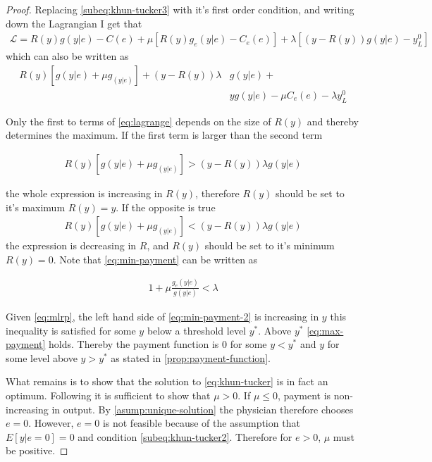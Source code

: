 \begin{proof}
Replacing \cref{subeq:khun-tucker3} with it's  first order condition, and writing down the Lagrangian I get that 
\begin{align}
    \mathcal{L}=R(y)g(y|e)-C(e)+\mu [R(y)g_e(y|e)-C_e(e)]+\lambda [(y-R(y))g(y|e)-y_L^0]
\end{align}
which can also be written as 
\begin{equation}
\begin{split}
   R(y)\left[g(y|e)+\mu g_(y|e)\right]+(y-R(y))\lambda &g(y|e)+ \\
                         & yg(y|e)-\mu C_e(e)-\lambda y_L^0 \label{eq:lagrange}
\end{split}
\end{equation}

Only the first to terms of \cref{eq:lagrange} depends on the size of $R(y)$ and thereby determines the maximum. If the first term is larger than the second term

\begin{align}
     R(y)\left[g(y|e)+\mu g_(y|e)\right]>(y-R(y))\lambda g(y|e) \label{eq:max-payment}
\end{align}

the whole expression is increasing in $R(y)$, therefore $R(y)$ should be set to it's maximum $R(y)=y$. If the opposite is true 
\begin{align}
     R(y)\left[g(y|e)+\mu g_(y|e)\right]<(y-R(y))\lambda g(y|e) \label{eq:min-payment}
\end{align}
the expression is decreasing in $R$, and $R(y)$ should be set to it's minimum $R(y)=0$. Note that \cref{eq:min-payment} can be written as

\begin{align}
   1+\mu \frac{g_e(y|e)}{g(y|e)}<\lambda \label{eq:min-payment-2}
\end{align}

Given \cref{eq:mlrp}, the left hand side of \cref{eq:min-payment-2} is increasing in $y$ this inequality is satisfied for some $y$ below a threshold level $y^*$. Above $y^*$ \cref{eq:max-payment} holds. Thereby the payment function is 0 for some $y<y^*$ and $y$ for some level above $y> y^*$ as stated in \cref{prop:payment-function}.

What remains is to show that the solution to \cref{eq:khun-tucker} is in fact an optimum. Following \textcite{Rogerson1985FirstOrder} it is sufficient to show that $\mu>0$. If $\mu\leq0$, payment is non-increasing in output. By \cref{asump:unique-solution} the physician therefore chooses $e=0$. However, $e=0$ is not feasible because of the assumption that $E[y|e=0]=0$ and condition \cref{subeq:khun-tucker2}. Therefore for $e>0$, $\mu$ must be positive. 
\end{proof}

